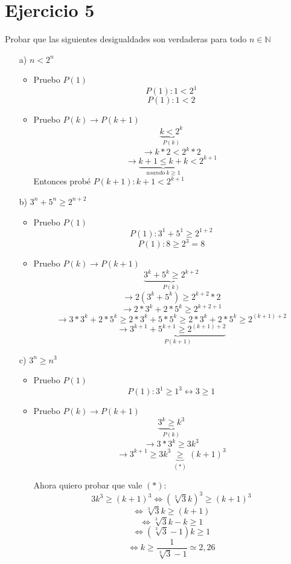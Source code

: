 \documentclass[10pt,a4paper]{article}
\begin{document}
\section*{Ejercicio 5}
Probar que las siguientes desigualdades son verdaderas para todo $n \in \mathbb{N}$
\begin{enumerate}
\item[a)]$n<2^{n}$
	\begin{itemize}
	\item Pruebo $P(1)$
	$$P(1):1<2^{1}$$
	$$P(1):1<2$$
	
	\item Pruebo $P(k)\rightarrow P(k+1)$
	$$\underbrace{k<2^{k}}_{P(k)} $$
	$$\rightarrow k*2<2^{k}*2$$
	$$\rightarrow \underbrace{k+1 \leq k+k}_{usando\ k\geq 1}<2^{k+1}$$
	Entonces probé $P(k+1):k+1<2^{k+1}$
	\end{itemize}
	
\item[b)]$3^{n}+5^{n}\geq 2^{n+2}$
	\begin{itemize}
	\item Pruebo $P(1)$
	$$P(1):3^{1}+5^{1}\geq 2^{1+2}$$
	$$P(1):8\geq 2^{3}=8$$
	
	\item Pruebo $P(k)\rightarrow P(k+1)$
	$$\underbrace{3^{k}+5^{k}\geq 2^{k+2}}_{P(k)}$$
	$$\rightarrow 2(3^{k}+5^{k})\geq 2^{k+2}*2$$
	$$\rightarrow 2*3^{k}+2*5^{k}\geq 2^{k+2+1}$$
	$$\rightarrow  3*3^{k}+2*5^{k} \geq 2*3^{k}+5*5^{k} \geq 2*3^{k}+2*5^{k}\geq 2^{(k+1)+2}$$
	$$\rightarrow \underbrace{3^{k+1}+5^{k+1}\geq 2^{(k+1)+2}}_{P(k+1)}$$
	\end{itemize}
	
\item[c)] $3^{n}\geq n^{3}$
	\begin{itemize}
	\item Pruebo $P(1)$
	$$P(1):3^{1}\geq 1^{3} \leftrightarrow 3\geq 1$$
	
	\item Pruebo $P(k)\rightarrow P(k+1)$
	$$\underbrace{3^{k}\geq k^{3}}_{P(k)}$$
	$$\rightarrow 3*3^{k}\geq 3k^{3}$$
	$$\rightarrow 3^{k+1}\geq 3k^{3} \underbrace{\geq}_{(*)} (k+1)^{3}$$
	
	Ahora quiero probar que vale $(*):$
	$$3k^{3} \geq (k+1)^{3} \Leftrightarrow (\sqrt[3]{3}  k)^{3} \geq (k+1)^{3}$$
	$$\Leftrightarrow \sqrt[3]{3}  k \geq (k+1)$$
	$$\Leftrightarrow \sqrt[3]{3}  k - k \geq 1$$
	$$\Leftrightarrow (\sqrt[3]{3}-1)k \geq 1$$
	$$\Leftrightarrow k \geq \frac{1}{\sqrt[3]{3}-1} \simeq 2,26$$
	

\end{itemize}
\end{enumerate}
\end{document}
